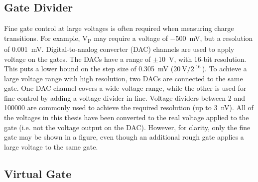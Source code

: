 \subsection{Gate Divider}
Fine gate control at large voltages is often required when measuring charge transitions. For example, V\textsubscript{P} may require a voltage of $-$\qty{500}{mV}, but a resolution of \qty{0.001}{mV}. Digital-to-analog converter (DAC) channels are used to apply voltage on the gates. The DACs have a range of $\pm$\qty{10}{V}, with 16-bit resolution. This puts a lower bound on the step size of \qty{0.305}{mV} ($\mathrm{\qty{20}{V}/\qty{2}{}^{\qty{16}{}}}$). To achieve a large voltage range with high resolution, two DACs are connected to the same gate. One DAC channel covers a wide voltage range, while the other is used for fine control by adding a voltage divider in line. Voltage dividers between \qty{2}{} and \qty{100000}{} are commonly used to achieve the required resolution (up to \qty{3}{nV}). All of the voltages in this thesis have been converted to the real voltage applied to the gate (i.e. not the voltage output on the DAC). However, for clarity, only the fine gate may be shown in a figure, even though an additional rough gate applies a large voltage to the same gate. 






\subsection{Virtual Gate}

